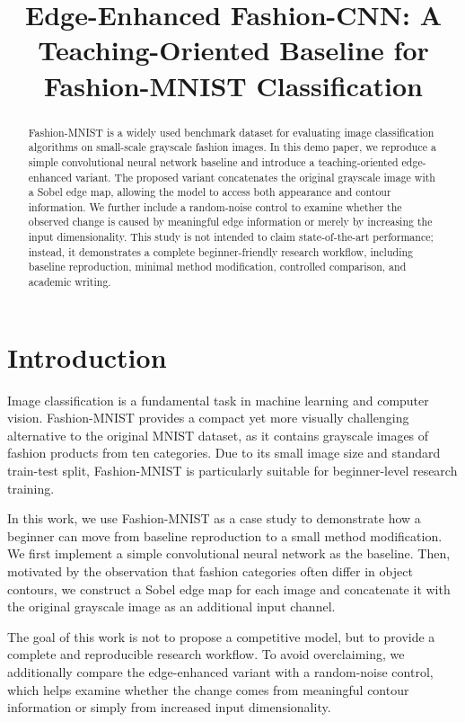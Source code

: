 \documentclass[10pt,conference]{IEEEtran}
\title{Edge-Enhanced Fashion-CNN: A Teaching-Oriented Baseline for Fashion-MNIST Classification}
\author{
\IEEEauthorblockN{Student Name}
\IEEEauthorblockA{Course Demo Project}
}
\begin{document}
\maketitle

\begin{abstract}
Fashion-MNIST is a widely used benchmark dataset for evaluating image classification algorithms on small-scale grayscale fashion images. In this demo paper, we reproduce a simple convolutional neural network baseline and introduce a teaching-oriented edge-enhanced variant. The proposed variant concatenates the original grayscale image with a Sobel edge map, allowing the model to access both appearance and contour information. We further include a random-noise control to examine whether the observed change is caused by meaningful edge information or merely by increasing the input dimensionality. This study is not intended to claim state-of-the-art performance; instead, it demonstrates a complete beginner-friendly research workflow, including baseline reproduction, minimal method modification, controlled comparison, and academic writing.
\end{abstract}

\section{Introduction}

Image classification is a fundamental task in machine learning and computer vision. Fashion-MNIST provides a compact yet more visually challenging alternative to the original MNIST dataset, as it contains grayscale images of fashion products from ten categories. Due to its small image size and standard train-test split, Fashion-MNIST is particularly suitable for beginner-level research training.

In this work, we use Fashion-MNIST as a case study to demonstrate how a beginner can move from baseline reproduction to a small method modification. We first implement a simple convolutional neural network as the baseline. Then, motivated by the observation that fashion categories often differ in object contours, we construct a Sobel edge map for each image and concatenate it with the original grayscale image as an additional input channel.

The goal of this work is not to propose a competitive model, but to provide a complete and reproducible research workflow. To avoid overclaiming, we additionally compare the edge-enhanced variant with a random-noise control, which helps examine whether the change comes from meaningful contour information or simply from increased input dimensionality.
\end{document}
